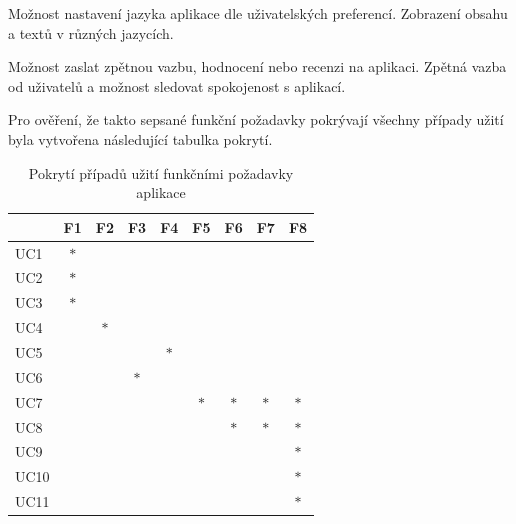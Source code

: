 Možnost nastavení jazyka aplikace dle uživatelských preferencí.
Zobrazení obsahu a textů v různých jazycích.

Možnost zaslat zpětnou vazbu, hodnocení nebo recenzi na aplikaci.
Zpětná vazba od uživatelů a možnost sledovat spokojenost s aplikací.


Pro ověření, že takto sepsané funkční požadavky pokrývají všechny případy užití byla vytvořena následující tabulka pokrytí.

\begin{table}[H]
  \centering
  \begin{tabular}{|l|c|c|c|c|c|c|c|c|}
  \hline
   & F1 & F2 & F3 & F4 & F5 & F6 & F7 & F8  \\ \hline
  UC1  & $\ast$ &        &        &        &        &        &        &         \\ \hline
  UC2  & $\ast$ &        &        &        &        &        &        &         \\ \hline
  UC3  & $\ast$ &        &        &        &        &        &        &         \\ \hline
  UC4  &        & $\ast$ &        &        &        &        &        &         \\ \hline
  UC5  &        &        &        & $\ast$ &        &        &        &         \\ \hline
  UC6  &        &        & $\ast$ &        &        &        &        &         \\ \hline
  UC7  &        &        &        &        & $\ast$ & $\ast$ & $\ast$ & $\ast$  \\ \hline
  UC8  &        &        &        &        &        & $\ast$ & $\ast$ & $\ast$  \\ \hline
  UC9  &        &        &        &        &        &        &        & $\ast$  \\ \hline
  UC10 &        &        &        &        &        &        &        & $\ast$  \\ \hline
  UC11 &        &        &        &        &        &        &        & $\ast$  \\ \hline
  \end{tabular}
  \caption{Pokrytí případů užití funkčními požadavky aplikace}
  \label{table:tabulkaPokryti}
\end{table}
  


